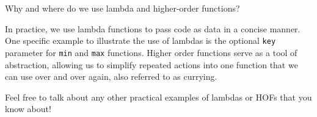 \begin{blocksection}
\question Why and where do we use lambda and higher-order functions?

\begin{solution}[0.5in]
In practice, we use lambda functions to pass code as data in a concise manner. One specific example to illustrate the use of lambdas is the optional \lstinline{key} parameter for \lstinline{min} and \lstinline{max} functions.
Higher order functions serve as a tool of abstraction, allowing us to simplify repeated actions into one function that we can use over and over again, also referred to as currying.

\end{solution}
\end{blocksection}

\begin{questionmeta}
    Feel free to talk about any other practical examples of lambdas or HOFs that you know about!
\end{questionmeta}
